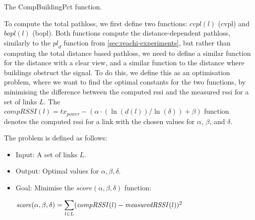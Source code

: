 \begin{algorithm}[ht]
    \DontPrintSemicolon

    \caption{The CompBuildingPct function.}
    \label{algo:linkmodel:compute-building-percentage}
\end{algorithm}

To compute the total \gls{pathloss}, we first define two functions: $\mathit{cvpl}(l)$ (\gls{cvpl}) and
$\mathit{bopl}(l)$ (\gls{bopl}). Both functions compute the distance-dependent \gls{pathloss}, similarly to
the $\mathit{pl}_d$ function from \autoref{sec:reachi-experiments}, but rather than computing the total
distance based \gls{pathloss}, we need to define a similar function for the distance with a clear view, and a
similar function to the distance where buildings obstruct the signal. To do this, we define this as an
optimisation problem, where we want to find the optimal constants for the two functions, by minimising the
difference between the computed \gls{rssi} and the measured \gls{rssi} for a set of links $L$. The
$\mathit{compRSSI}(l) = \mathit{tx}_\mathit{power} - (\alpha \cdot (\ln(d(l)) / \ln(\delta)) + \beta)$
function denotes the computed \gls{rssi} for a link with the chosen values for $\alpha$, $\beta$, and
$\delta$.
\medbreak

The problem is defined as follows:

\begin{itemize}
    \item Input: A set of links $L$.
    \item Output: Optimal values for $\alpha, \beta, \delta$.
    \item Goal: Minimise the $\mathit{score}(\alpha, \beta, \delta)$ function:

          $\mathit{score}(\alpha, \beta, \delta) = \mathlarger{\sum}\limits_{l \in L} (\mathit{compRSSI}(l) - \mathit{measuredRSSI}(l))^2$
\end{itemize}

